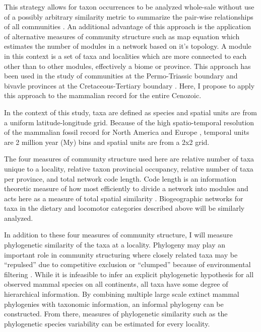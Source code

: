 \documentclass[11pt,letterpaper]{article}
\begin{document}
This strategy allows for taxon occurrences to be analyzed whole-sale without use of a possibly arbitrary similarity metric to summarize the pair-wise relationships of all communities \citep{Sidor2013}. An additional advantage of this approach is the application of alternative measures of community structure such as map equation \citep{Rosvall2008,Rosvall2009a} which estimates the number of modules in a network based on it's topology. A module in this context is a set of taxa and localities which are more connected to each other than to other modules, effectively a biome or province. This approach has been used in the study of communities at the Permo-Triassic boundary \citep{Sidor2013} and bivavle provinces at the Cretaceous-Tertiary boundary \citep{Vilhena2013}. Here, I propose to apply this approach to the mammalian record for the entire Cenozoic.

In the context of this study, taxa are defined as species and spatial units are from a uniform latitude-longitude grid. Because of the high spatio-temporal resolution of the mammalian fossil record for North America and Europe \citep{Alroy2009,Marcot2014,Fortelius2002,Jernvall2004}, temporal units are 2 million year (My) bins and spatial units are from a 2x2 grid.

The four measures of community structure used here are relative number of taxa unique to a locality, relative taxon provincial occupancy, relative number of taxa per province, and total network code length. Code length is an information theoretic measure of how most efficiently to divide a network into modules and acts here as a measure of total spatial similarity \citep{Rosvall2008,Rosvall2009a}. Biogeographic networks for taxa in the dietary and locomotor categories described above will be similarly analyzed.

In addition to these four measures of community structure, I will measure phylogenetic similarity of the taxa at a locality. Phylogeny may play an important role in community structuring where closely related taxa may be ``repulsed'' due to competitive exclusion or ``clumped'' because of environmental filtering \citep{Webb2002}. While it is infeasible to infer an explicit phylogenetic hypothesis for all observed mammal species on all continents, all taxa have some degree of hierarchical information. By combining multiple large scale extinct mammal phylogenies with taxonomic information, an informal phylogeny can be constructed. From there, measures of phylogenetic similarity such as the phylogenetic species variability \citep{Helmus2007a} can be estimated for every locality. 
\end{document}
